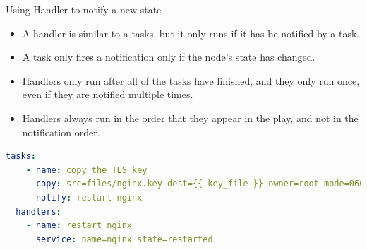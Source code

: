 \documentclass[xcolor=dvipsnames,slidestop, mathserif]{beamer}
\begin{document}

\begin{frame}[fragile]{Using Handler to notify a new state}
\begin{itemize}
  \item A handler is similar to a tasks, but it only runs if it has be notified by a task.
  \item A task only fires a notification only if the node's state has changed.
  \item Handlers only run after all of the tasks have finished, and they only run once, even if they are notified multiple times.
  \item Handlers always run in the order that they appear in the play,  and not in the notification order.
\end{itemize}

\begin{lstlisting}[language=yaml,frame=tb]
  tasks:
    - name: copy the TLS key
      copy: src=files/nginx.key dest={{ key_file }} owner=root mode=0600
      notify: restart nginx
  handlers:
    - name: restart nginx
      service: name=nginx state=restarted
\end{lstlisting}

\end{frame}


  
\end{document}
